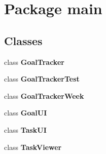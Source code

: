 \section{Package main}
\label{namespacemain}
\subsection*{Classes}
\begin{DoxyCompactItemize}
\item 
class \textbf{ Goal\+Tracker}
\item 
class \textbf{ Goal\+Tracker\+Test}
\item 
class \textbf{ Goal\+Tracker\+Week}
\item 
class \textbf{ Goal\+UI}
\item 
class \textbf{ Task\+UI}
\item 
class \textbf{ Task\+Viewer}
\end{DoxyCompactItemize}
